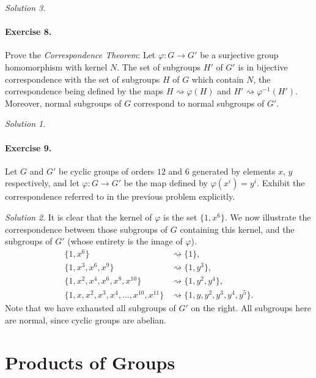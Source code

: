 \documentclass[11pt]{report}
\theoremstyle{remark}
\newtheorem*{solution}{Solution}
\begin{document}
\begin{solution}
    \paragraph{Exercise 8.} Prove the \textit{Correspondence Theorem}: Let
    $\varphi\colon G \to G'$ be a surjective group homomorphism with kernel $N$. The
    set of subgroups $H'$ of $G'$ is in bijective correspondence with the set of
    subgroups $H$ of $G$ which contain $N$, the correspondence being defined by the
    maps $H \rightsquigarrow \varphi(H)$ and $H' \rightsquigarrow \varphi^{-1}(H')$.
    Moreover, normal subgroups of $G$ correspond to normal subgroups of $G'$.
    \begin{solution}
        
    \end{solution}

    \paragraph{Exercise 9.} Let $G$ and $G'$ be cyclic groups of orders $12$ and $6$
    generated by elements $x$, $y$ respectively, and let $\varphi\colon G \to G'$ be
    the map defined by $\varphi(x^i) = y^i$. Exhibit the correspondence referred to
    in the previous problem explicitly.
    \begin{solution}
        It is clear that the kernel of $\varphi$ is the set $\{1, x^6\}$. We now
        illustrate the correspondence between those subgroups of $G$ containing this
        kernel, and the subgroups of $G'$ (whose entirety is the image of $\varphi$).
        \[
        \begin{array}{rl}
             \{1, x^6\} &\rightsquigarrow \{1\}, \\
             \{1, x^3, x^6, x^9\} &\rightsquigarrow \{1, y^3\}, \\
             \{1, x^2, x^4, x^6, x^8, x^{10}\} &\rightsquigarrow \{1, y^2, y^4\}, \\
             \{1, x, x^2, x^3, x^4, \dots, x^{10}, x^{11}\} &\rightsquigarrow \{1, y,
             y^2, y^3, y^4, y^5\}.
        \end{array}
        \] Note that we have exhausted all subgroups of $G'$ on the right. All
        subgroups here are normal, since cyclic groups are abelian.
    \end{solution}
    


    \section{Products of Groups}


\end{solution}
\end{document}
